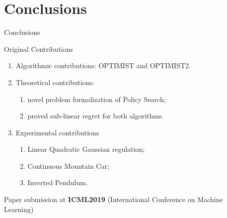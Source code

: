 \section{Conclusions}


\begin{frame}{Conclusions}
	
	\begin{block}{Original Contributions}

	\begin{enumerate}
		\item<+-|alert@+> Algorithmic contributions: OPTIMIST and OPTIMIST2.
		\item<+-|alert@+> Theoretical contributions:
		\begin{enumerate}
			\item<+-|alert@+> novel problem formalization of Policy Search;
			\item<+-|alert@+> proved sub-linear regret for both algorithms.
		\end{enumerate}
		\item<+-|alert@+> Experimental contributions
		\begin{enumerate}
			\item<+-|alert@+> Linear Quadratic Gaussian regulation;
			\item<+-|alert@+> Continuous Mountain Car;
			\item<+-|alert@+> Inverted Pendulum.
		\end{enumerate}
	\end{enumerate}
	\onslide<+-> Paper submission at \textbf{ICML2019} (International Conference on Machine Learning)
	\end{block}
	
	
\end{frame}